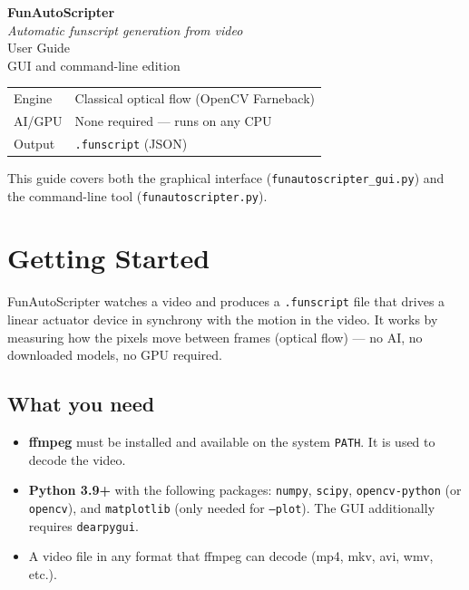 \documentclass[11pt,a4paper]{article}
\newcommand{\code}[1]{\texttt{#1}}
\begin{document}
\begin{titlepage}
  \centering
  \vspace*{3cm}
  {\Huge\bfseries FunAutoScripter}\\[0.6em]
  {\large\itshape Automatic funscript generation from video}\\[2.5cm]
  {\large User Guide}\\[0.4em]
  {\normalsize\color{gray} GUI and command-line edition}\\[4cm]
  \begin{tabular}{ll}
    Engine  & Classical optical flow (OpenCV Farneback) \\
    AI/GPU  & None required --- runs on any CPU \\
    Output  & \code{.funscript} (JSON) \\
  \end{tabular}
  \vfill
  {\small\color{gray} This guide covers both the graphical interface (\code{funautoscripter\_gui.py}) and the command-line tool (\code{funautoscripter.py}).}
\end{titlepage}

\tableofcontents
\newpage

\section{Getting Started}
\label{sec:start}

FunAutoScripter watches a video and produces a \code{.funscript} file that drives a linear actuator device in synchrony with the motion in the video. It works by measuring how the pixels move between frames (optical flow) --- no AI, no downloaded models, no GPU required.

\subsection{What you need}

\begin{itemize}[noitemsep]
  \item \textbf{ffmpeg} must be installed and available on the system \code{PATH}. It is used to decode the video.
  \item \textbf{Python 3.9+} with the following packages: \code{numpy}, \code{scipy}, \code{opencv-python} (or \code{opencv}), and \code{matplotlib} (only needed for \code{--plot}). The GUI additionally requires \code{dearpygui}.
  \item A video file in any format that ffmpeg can decode (mp4, mkv, avi, wmv, etc.).
\end{itemize}
\end{document}

